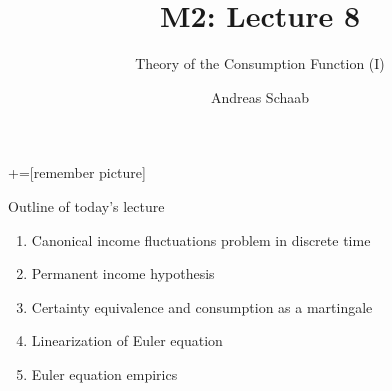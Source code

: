 \documentclass[10pt]{beamer}
\title{\large M2: Lecture 8}
\subtitle{Theory of the Consumption Function (I)}
\author{Andreas Schaab}
\date{}
\begin{document}
+=[remember picture]
\thispagestyle{empty}
\maketitle 
\newpage

\addtocounter{framenumber}{-1}




\begin{frame}{Outline of today's lecture}
\addtocounter{framenumber}{-1}

\begin{enumerate}
\item Canonical income fluctuations problem in discrete time

\vspace{2mm}
\item Permanent income hypothesis

\vspace{2mm}
\item Certainty equivalence and consumption as a martingale

\vspace{2mm}
\item Linearization of Euler equation

\vspace{2mm}
\item Euler equation empirics

\end{enumerate}
\end{frame}
\end{document}
